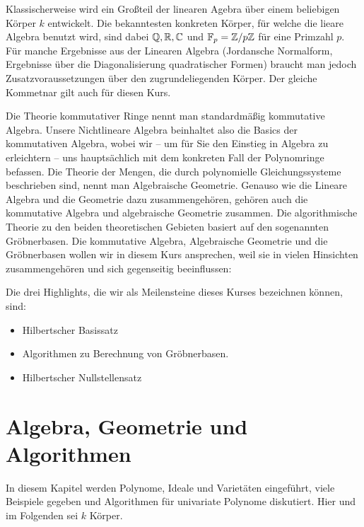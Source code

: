 \documentclass[11pt]{article}
\numberwithin{equation}{section}
\begin{document}
Klassischerweise wird ein Großteil der linearen Agebra über einem beliebigen Körper $k$ entwickelt. Die bekanntesten konkreten Körper, für welche die lieare Algebra benutzt wird, sind dabei $\mathbb{Q}, \mathbb{R}, \mathbb{C}$ und $\mathbb{F}_p = \mathbb{Z} / p \mathbb{Z}$ für eine Primzahl $p$.  Für manche Ergebnisse aus der Linearen Algebra (Jordansche Normalform, Ergebnisse über die Diagonalisierung quadratischer Formen) braucht man jedoch Zusatzvoraussetzungen über den zugrundeliegenden Körper. Der gleiche Kommetnar gilt auch für diesen Kurs.

Die Theorie kommutativer Ringe nennt man standardmäßig kommutative Algebra. Unsere Nichtlineare Algebra beinhaltet also die Basics der kommutativen Algebra, wobei wir -- um für Sie den Einstieg in Algebra zu erleichtern -- uns hauptsächlich mit dem konkreten Fall der Polynomringe befassen. Die Theorie der Mengen, die durch polynomielle Gleichungssysteme beschrieben sind, nennt man Algebraische Geometrie. Genauso wie die Lineare Algebra und die Geometrie dazu zusammengehören, gehören auch die kommutative Algebra und algebraische Geometrie zusammen.  Die algorithmische Theorie zu den beiden theoretischen Gebieten basiert auf den sogenannten Gröbnerbasen. Die kommutative Algebra, Algebraische Geometrie und die Gröbnerbasen wollen wir in diesem Kurs ansprechen, weil sie in vielen Hinsichten zusammengehören und sich gegenseitig beeinflussen: 

Die drei Highlights, die wir als Meilensteine dieses Kurses bezeichnen können,  sind: 
\begin{itemize}
	\item Hilbertscher Basissatz %
	\item Algorithmen zu Berechnung von Gröbnerbasen. %
	\item Hilbertscher Nullstellensatz %
\end{itemize} 

\clearpage 

\section{Algebra, Geometrie und Algorithmen} 

In diesem Kapitel werden Polynome, Ideale und Varietäten eingeführt, viele Beispiele gegeben und Algorithmen für univariate Polynome diskutiert. Hier und im Folgenden sei $k$ Körper. 
\end{document}
